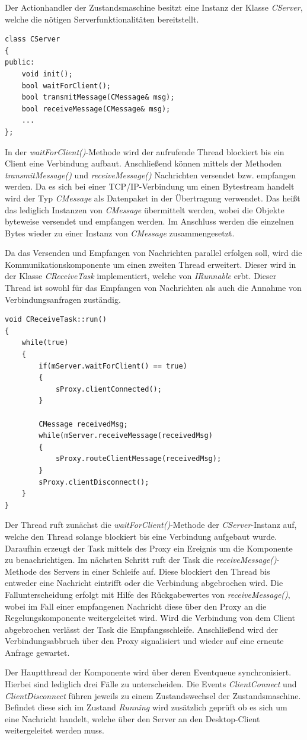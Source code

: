 Der Actionhandler der Zustandsmaschine besitzt eine Instanz der Klasse \textit{CServer}, welche die nötigen Serverfunktionalitäten bereitstellt.
\begin{lstlisting}
class CServer
{
public:
	void init();
	bool waitForClient();
	bool transmitMessage(CMessage& msg);
	bool receiveMessage(CMessage& msg);
	...
};
\end{lstlisting}
In der \textit{waitForClient()}-Methode wird der aufrufende Thread blockiert bis ein Client eine Verbindung aufbaut. Anschließend können mittels der Methoden \textit{transmitMessage()} und \textit{receiveMessage()} Nachrichten versendet bzw. empfangen werden. Da es sich bei einer TCP/IP-Verbindung um einen Bytestream handelt wird der Typ \textit{CMessage} als Datenpaket in der Übertragung verwendet. Das heißt das lediglich Instanzen von \textit{CMessage} übermittelt werden, wobei die Objekte byteweise versendet und empfangen werden. Im Anschluss werden die einzelnen Bytes wieder zu einer Instanz von \textit{CMessage} zusammengesetzt.

Da das Versenden und Empfangen von Nachrichten parallel erfolgen soll, wird die Kommunikationskomponente um einen zweiten Thread erweitert. Dieser wird in der Klasse \textit{CReceiveTask} implementiert, welche von \textit{IRunnable} erbt. Dieser Thread ist sowohl für das Empfangen von Nachrichten als auch die Annahme von Verbindungsanfragen zuständig.
\begin{lstlisting}
void CReceiveTask::run()
{
	while(true)
	{
		if(mServer.waitForClient() == true)
		{
			sProxy.clientConnected();
		}
		
		CMessage receivedMsg;
		while(mServer.receiveMessage(receivedMsg)
		{
			sProxy.routeClientMessage(receivedMsg);
		}
		sProxy.clientDisconnect();
	}
}
\end{lstlisting}
Der Thread ruft zunächst die \textit{waitForClient()}-Methode der \textit{CServer}-Instanz auf, welche den Thread solange blockiert bis eine Verbindung aufgebaut wurde. Daraufhin erzeugt der Task mittels des Proxy ein Ereignis um die Komponente zu benachrichtigen. Im nächsten Schritt ruft der Task die \textit{receiveMessage()}-Methode des Servers in einer Schleife auf. Diese blockiert den Thread bis entweder eine Nachricht eintrifft oder die Verbindung abgebrochen wird. Die Fallunterscheidung erfolgt mit Hilfe des Rückgabewertes von \textit{receiveMessage()}, wobei im Fall einer empfangenen Nachricht diese über den Proxy an die Regelungskomponente weitergeleitet wird. Wird die Verbindung von dem Client abgebrochen verlässt der Task die Empfangsschleife. Anschließend wird der Verbindungsabbruch über den Proxy signalisiert und wieder auf eine erneute Anfrage gewartet.

Der Hauptthread der Komponente wird über deren Eventqueue synchronisiert. Hierbei sind lediglich drei Fälle zu unterscheiden. Die Events \textit{ClientConnect} und \textit{ClientDisconnect} führen jeweils zu einem Zustandswechsel der Zustandsmaschine. Befindet diese sich im Zustand \textit{Running} wird zusätzlich geprüft ob es sich um eine Nachricht handelt, welche über den Server an den Desktop-Client weitergeleitet werden muss.